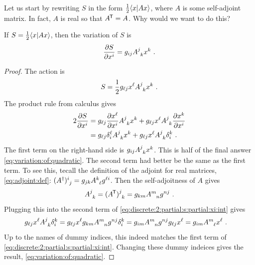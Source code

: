 Let us start by rewriting $S$ in the form $\frac{1}{2}\langle x | A x \rangle$, where $A$ is some self-adjoint matrix. In fact, $A$ is real so that $A^{\mkern-1.5mu\mathsf{T}} = A$. Why would we want to do this? 
\begin{theorem}\label{thm:quadratic:action}
If $S=\frac{1}{2} \langle x | A x \rangle$, then the variation of $S$ is
\begin{align}
    \frac{\partial S}{\partial x^i}
    = 
    g_{ij}A\aij{j}{k}x^k \ .
    \label{eq:variation:of:quadratic}
\end{align}
\end{theorem}
\begin{proof}
The action is
\begin{align}
    S= \frac{1}{2}  g_{\ell j}x^\ell A\aij{j}{k}x^k \ .
\end{align}
The product rule from calculus gives
\begin{align}
    2 \frac{\partial S}{\partial x^i}
    &= 
    g_{\ell j}
    \frac{\partial x^\ell}{\partial x^i} A\aij{j}{k}x^k
    + 
    g_{\ell j} x^\ell A\aij{j}{k}
    \frac{\partial x^k}{\partial x^i}
    \\
    &=
    g_{\ell j}
    \delta^\ell_i A\aij{j}{k}x^k
    + 
    g_{\ell j} x^\ell A\aij{j}{k}
    \delta^k_i 
    \label{eq:discrete:2:partial:s:partial:xi:int}
    \ .
\end{align}
The first term on the right-hand side is 
$g_{i j} A\aij{j}{k}x^k$. This is half of the final answer \eqref{eq:variation:of:quadratic}. The second term had better be the same as the first term. To see this, tecall the definition of the adjoint for real matrices, \eqref{eq:adjoint:def}: $(A^\dag)\aij{i}{j} = g_{jk}A\aij{k}{\ell}g^{\ell i}$. Then the self-adjoitness of $A$ gives
\begin{align}
    A\aij{j}{k} = (A^\trans)\aij{j}{k}
    = g_{km}A\aij{m}{n}g^{nj} \ .
\end{align}
Plugging this into the second term of \eqref{eq:discrete:2:partial:s:partial:xi:int} gives
\begin{align}
    g_{\ell j} x^\ell A\aij{j}{k}
    \delta^k_i 
    &=
    g_{\ell j} x^\ell 
    g_{km}A\aij{m}{n}g^{nj}
    \delta^k_i 
    =
    g_{im}A\aij{m}{n}
    g^{nj}
    g_{\ell j} 
    x^\ell 
    =
    g_{im}A\aij{m}{\ell}
    x^\ell \ .
\end{align}
Up to the names of dummy indices, this indeed matches the first term of \eqref{eq:discrete:2:partial:s:partial:xi:int}. Changing these dummy indeices gives the result, \eqref{eq:variation:of:quadratic}.
\end{proof}

